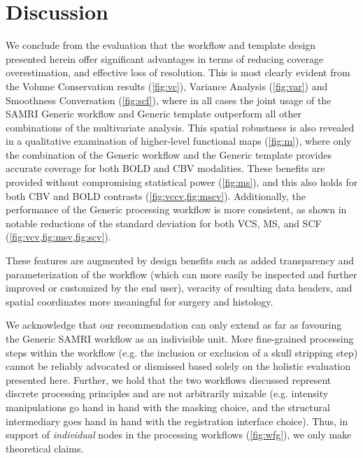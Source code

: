 \section{Discussion}

We conclude from the evaluation that the workflow and template design presented herein offer significant advantages in terms of reducing coverage overestimation, and effective loss of resolution.
This is most clearly evident from the Volume Conservation results (\cref{fig:vc}), Variance Analysis (\cref{fig:var}) and Smoothness Conversation (\cref{fig:scf}), where in all cases the joint usage of the SAMRI Generic workflow and Generic template outperform all other combinations of the multivariate analysis.
This spatial robustness is also revealed in a qualitative examination of higher-level functional maps (\cref{fig:m}), where only the combination of the Generic workflow and the Generic template provides accurate coverage for both BOLD and CBV modalities.
These benefits are provided without compromising statistical power (\cref{fig:ms}), and this also holds for both CBV and BOLD contrasts (\cref{fig:vccv,fig:mscv}).
Additionally, the performance of the Generic processing workflow is more consistent, as shown in notable reductions of the standard deviation for both VCS, MS, and SCF (\cref{fig:vcv,fig:msv,fig:scv}).

These features are augmented by design benefits such as added transparency and parameterization of the workflow (which can more easily be inspected and further improved or customized by the end user), veracity of resulting data headers, and spatial coordinates more meaningful for surgery and histology.


We acknowledge that our recommendation can only extend as far as favouring the Generic SAMRI workflow as an indivisible unit.
More fine-grained processing steps within the workflow (e.g. the inclusion or exclusion of a skull stripping step) cannot be reliably advocated or dismissed based solely on the holistic evaluation presented here.
Further, we hold that the two workflows discussed represent discrete processing principles and are not arbitrarily mixable (e.g. intensity manipulations go hand in hand with the masking choice, and the structural intermediary goes hand in hand with the registration interface choice).
Thus, in support of \textit{individual} nodes in the processing workflows (\cref{fig:wfg}), we only make theoretical claims.

